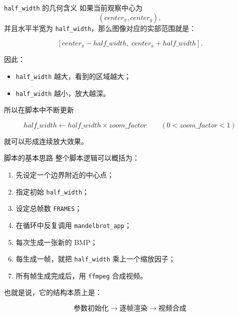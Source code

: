 \documentclass[aspectratio=169,11pt]{ctexbeamer}
\begin{document}
\begin{frame}[fragile]{\texttt{half\_width} 的几何含义}
如果当前观察中心为
\[
(center_x, center_y),
\]
并且水平半宽为 \texttt{half\_width}，那么图像对应的实部范围就是：

\[
[center_x - half\_width,\; center_x + half\_width].
\]

\vspace{0.5em}
因此：

\begin{itemize}
  \item \texttt{half\_width} 越大，看到的区域越大；
  \item \texttt{half\_width} 越小，放大越深。
\end{itemize}

\vspace{0.5em}
所以在脚本中不断更新

\[
half\_width \leftarrow half\_width \times zoom\_factor
\qquad (0 < zoom\_factor < 1)
\]

就可以形成连续放大效果。
\end{frame}

\begin{frame}[fragile]{脚本的基本思路}
整个脚本逻辑可以概括为：

\begin{enumerate}
  \item 先设定一个边界附近的中心点；
  \item 指定初始 \texttt{half\_width}；
  \item 设定总帧数 \texttt{FRAMES}；
  \item 在循环中反复调用 \texttt{mandelbrot\_app}；
  \item 每次生成一张新的 BMP；
  \item 每生成一帧，就把 \texttt{half\_width} 乘上一个缩放因子；
  \item 所有帧生成完成后，用 \texttt{ffmpeg} 合成视频。
\end{enumerate}

\vspace{0.5em}
也就是说，它的结构本质上是：

\[
\text{参数初始化}
\to
\text{逐帧渲染}
\to
\text{视频合成}
\]
\end{frame}
\end{document}
